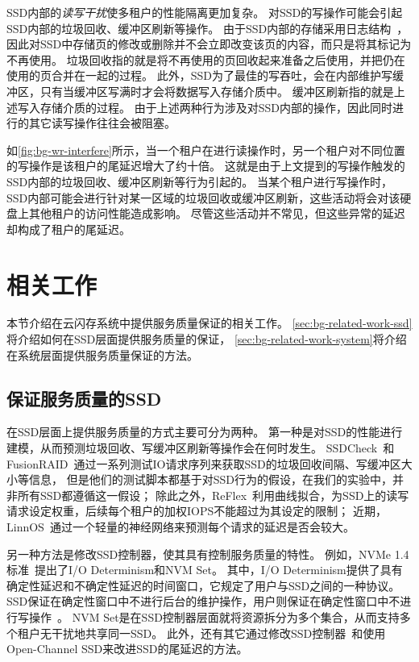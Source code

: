 SSD内部的\textit{读写干扰}使多租户的性能隔离更加复杂。
对SSD的写操作可能会引起SSD内部的垃圾回收、缓冲区刷新等操作。
由于SSD内部的存储采用日志结构~\cite{ArpaciDusseau18-Book}，因此对SSD中存储页的修改或删除并不会立即改变该页的内容，而只是将其标记为不再使用。
垃圾回收指的就是将不再使用的页回收起来准备之后使用，并把仍在使用的页合并在一起的过程。
此外，SSD为了最佳的写吞吐，会在内部维护写缓冲区，只有当缓冲区写满时才会将数据写入存储介质中。
缓冲区刷新指的就是上述写入存储介质的过程。
由于上述两种行为涉及对SSD内部的操作，因此同时进行的其它读写操作往往会被阻塞。

如\autoref{fig:bg-wr-interfere}所示，当一个租户在进行读操作时，另一个租户对不同位置的写操作是该租户的尾延迟增大了约十倍。
这就是由于上文提到的写操作触发的SSD内部的垃圾回收、缓冲区刷新等行为引起的。
当某个租户进行写操作时，SSD内部可能会进行针对某一区域的垃圾回收或缓冲区刷新，这些活动将会对该硬盘上其他租户的访问性能造成影响。
尽管这些活动并不常见，但这些异常的延迟却构成了租户的尾延迟。

\section{相关工作}
\label{sec:bg-related-work}

本节介绍在云闪存系统中提供服务质量保证的相关工作。
\autoref{sec:bg-related-work-ssd}将介绍如何在SSD层面提供服务质量的保证，
\autoref{sec:bg-related-work-system}将介绍在系统层面提供服务质量保证的方法。

\subsection{保证服务质量的SSD}
\label{sec:bg-related-work-ssd}

在SSD层面上提供服务质量的方式主要可分为两种。
第一种是对SSD的性能进行建模，从而预测垃圾回收、写缓冲区刷新等操作会在何时发生。
SSDCheck~\cite{kim2018ssdcheck}和FusionRAID~\cite{jiang2021fusionraid}通过一系列测试IO请求序列来获取SSD的垃圾回收间隔、写缓冲区大小等信息，
但是他们的测试脚本都基于对SSD行为的假设，在我们的实验中，并非所有SSD都遵循这一假设；
除此之外，ReFlex~\cite{klimovic2017reflex}利用曲线拟合，为SSD上的读写请求设定权重，后续每个租户的加权IOPS不能超过为其设定的限制；
近期，LinnOS~\cite{hao2020linnos}通过一个轻量的神经网络来预测每个请求的延迟是否会较大。

另一种方法是修改SSD控制器，使其具有控制服务质量的特性。
例如，NVMe 1.4标准~\cite{nvme2020}提出了I/O Determinism和NVM Set。
其中，I/O Determinism提供了具有确定性延迟和不确定性延迟的时间窗口，它规定了用户与SSD之间的一种协议。
SSD保证在确定性窗口中不进行后台的维护操作，用户则保证在确定性窗口中不进行写操作~\cite{petersen2018enabling}。
NVM Set是在SSD控制器层面就将资源拆分为多个集合，从而支持多个租户无干扰地共享同一SSD。
此外，还有其它通过修改SSD控制器~\cite{yan2017tiny,arash2018flin}和使用Open-Channel SSD来改进SSD的尾延迟的方法。


